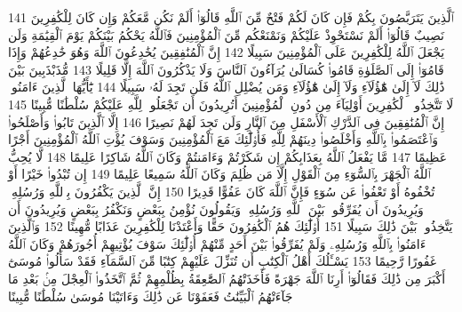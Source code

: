 {\tiny\colorbox{cl_aya}{141}} ٱلَّذِينَ يَتَرَبَّصُونَ بِكُمْ فَإِن كَانَ لَكُمْ فَتْحٌ مِّنَ ٱللَّهِ قَالُوٓا۟ أَلَمْ نَكُن مَّعَكُمْ وَإِن كَانَ لِلْكَٰفِرِينَ نَصِيبٌ قَالُوٓا۟ أَلَمْ نَسْتَحْوِذْ عَلَيْكُمْ وَنَمْنَعْكُم مِّنَ ٱلْمُؤْمِنِينَ فَٱللَّهُ يَحْكُمُ بَيْنَكُمْ يَوْمَ ٱلْقِيَٰمَةِ وَلَن يَجْعَلَ ٱللَّهُ لِلْكَٰفِرِينَ عَلَى ٱلْمُؤْمِنِينَ سَبِيلًا
{\tiny\colorbox{cl_aya}{142}} إِنَّ ٱلْمُنَٰفِقِينَ يُخَٰدِعُونَ ٱللَّهَ وَهُوَ خَٰدِعُهُمْ وَإِذَا قَامُوٓا۟ إِلَى ٱلصَّلَوٰةِ قَامُوا۟ كُسَالَىٰ يُرَآءُونَ ٱلنَّاسَ وَلَا يَذْكُرُونَ ٱللَّهَ إِلَّا قَلِيلًا
{\tiny\colorbox{cl_aya}{143}} مُّذَبْذَبِينَ بَيْنَ ذَٰلِكَ لَآ إِلَىٰ هَٰٓؤُلَآءِ وَلَآ إِلَىٰ هَٰٓؤُلَآءِ وَمَن يُضْلِلِ ٱللَّهُ فَلَن تَجِدَ لَهُۥ سَبِيلًا
{\tiny\colorbox{cl_aya}{144}} يَٰٓأَيُّهَا ٱلَّذِينَ ءَامَنُوا۟ لَا تَتَّخِذُوا۟ ٱلْكَٰفِرِينَ أَوْلِيَآءَ مِن دُونِ ٱلْمُؤْمِنِينَ أَتُرِيدُونَ أَن تَجْعَلُوا۟ لِلَّهِ عَلَيْكُمْ سُلْطَٰنًا مُّبِينًا
{\tiny\colorbox{cl_aya}{145}} إِنَّ ٱلْمُنَٰفِقِينَ فِى ٱلدَّرْكِ ٱلْأَسْفَلِ مِنَ ٱلنَّارِ وَلَن تَجِدَ لَهُمْ نَصِيرًا
{\tiny\colorbox{cl_aya}{146}} إِلَّا ٱلَّذِينَ تَابُوا۟ وَأَصْلَحُوا۟ وَٱعْتَصَمُوا۟ بِٱللَّهِ وَأَخْلَصُوا۟ دِينَهُمْ لِلَّهِ فَأُو۟لَٰٓئِكَ مَعَ ٱلْمُؤْمِنِينَ وَسَوْفَ يُؤْتِ ٱللَّهُ ٱلْمُؤْمِنِينَ أَجْرًا عَظِيمًا
{\tiny\colorbox{cl_aya}{147}} مَّا يَفْعَلُ ٱللَّهُ بِعَذَابِكُمْ إِن شَكَرْتُمْ وَءَامَنتُمْ وَكَانَ ٱللَّهُ شَاكِرًا عَلِيمًا
{\tiny\colorbox{cl_aya}{148}} لَّا يُحِبُّ ٱللَّهُ ٱلْجَهْرَ بِٱلسُّوٓءِ مِنَ ٱلْقَوْلِ إِلَّا مَن ظُلِمَ وَكَانَ ٱللَّهُ سَمِيعًا عَلِيمًا
{\tiny\colorbox{cl_aya}{149}} إِن تُبْدُوا۟ خَيْرًا أَوْ تُخْفُوهُ أَوْ تَعْفُوا۟ عَن سُوٓءٍ فَإِنَّ ٱللَّهَ كَانَ عَفُوًّا قَدِيرًا
{\tiny\colorbox{cl_aya}{150}} إِنَّ ٱلَّذِينَ يَكْفُرُونَ بِٱللَّهِ وَرُسُلِهِۦ وَيُرِيدُونَ أَن يُفَرِّقُوا۟ بَيْنَ ٱللَّهِ وَرُسُلِهِۦ وَيَقُولُونَ نُؤْمِنُ بِبَعْضٍ وَنَكْفُرُ بِبَعْضٍ وَيُرِيدُونَ أَن يَتَّخِذُوا۟ بَيْنَ ذَٰلِكَ سَبِيلًا
{\tiny\colorbox{cl_aya}{151}} أُو۟لَٰٓئِكَ هُمُ ٱلْكَٰفِرُونَ حَقًّا وَأَعْتَدْنَا لِلْكَٰفِرِينَ عَذَابًا مُّهِينًا
{\tiny\colorbox{cl_aya}{152}} وَٱلَّذِينَ ءَامَنُوا۟ بِٱللَّهِ وَرُسُلِهِۦ وَلَمْ يُفَرِّقُوا۟ بَيْنَ أَحَدٍ مِّنْهُمْ أُو۟لَٰٓئِكَ سَوْفَ يُؤْتِيهِمْ أُجُورَهُمْ وَكَانَ ٱللَّهُ غَفُورًا رَّحِيمًا
{\tiny\colorbox{cl_aya}{153}} يَسْـَٔلُكَ أَهْلُ ٱلْكِتَٰبِ أَن تُنَزِّلَ عَلَيْهِمْ كِتَٰبًا مِّنَ ٱلسَّمَآءِ فَقَدْ سَأَلُوا۟ مُوسَىٰٓ أَكْبَرَ مِن ذَٰلِكَ فَقَالُوٓا۟ أَرِنَا ٱللَّهَ جَهْرَةً فَأَخَذَتْهُمُ ٱلصَّٰعِقَةُ بِظُلْمِهِمْ ثُمَّ ٱتَّخَذُوا۟ ٱلْعِجْلَ مِنۢ بَعْدِ مَا جَآءَتْهُمُ ٱلْبَيِّنَٰتُ فَعَفَوْنَا عَن ذَٰلِكَ وَءَاتَيْنَا مُوسَىٰ سُلْطَٰنًا مُّبِينًا

